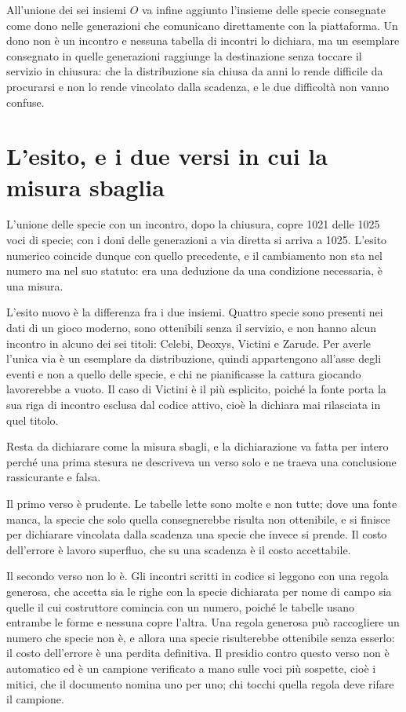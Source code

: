 All'unione dei sei insiemi $O$ va infine aggiunto l'insieme delle specie consegnate come dono nelle generazioni che comunicano direttamente con la piattaforma. Un dono non è un incontro e nessuna tabella di incontri lo dichiara, ma un esemplare consegnato in quelle generazioni raggiunge la destinazione senza toccare il servizio in chiusura: che la distribuzione sia chiusa da anni lo rende difficile da procurarsi e non lo rende vincolato dalla scadenza, e le due difficoltà non vanno confuse.

\section{L'esito, e i due versi in cui la misura sbaglia}

L'unione delle specie con un incontro, dopo la chiusura, copre 1021 delle 1025 voci di specie; con i doni delle generazioni a via diretta si arriva a 1025. L'esito numerico coincide dunque con quello precedente, e il cambiamento non sta nel numero ma nel suo statuto: era una deduzione da una condizione necessaria, è una misura.

L'esito nuovo è la differenza fra i due insiemi. Quattro specie sono presenti nei dati di un gioco moderno, sono ottenibili senza il servizio, e non hanno alcun incontro in alcuno dei sei titoli: Celebi, Deoxys, Victini e Zarude. Per averle l'unica via è un esemplare da distribuzione, quindi appartengono all'asse degli eventi e non a quello delle specie, e chi ne pianificasse la cattura giocando lavorerebbe a vuoto. Il caso di Victini è il più esplicito, poiché la fonte porta la sua riga di incontro esclusa dal codice attivo, cioè la dichiara mai rilasciata in quel titolo.

Resta da dichiarare come la misura sbagli, e la dichiarazione va fatta per intero perché una prima stesura ne descriveva un verso solo e ne traeva una conclusione rassicurante e falsa.

Il primo verso è prudente. Le tabelle lette sono molte e non tutte; dove una fonte manca, la specie che solo quella consegnerebbe risulta non ottenibile, e si finisce per dichiarare vincolata dalla scadenza una specie che invece si prende. Il costo dell'errore è lavoro superfluo, che su una scadenza è il costo accettabile.

Il secondo verso non lo è. Gli incontri scritti in codice si leggono con una regola generosa, che accetta sia le righe con la specie dichiarata per nome di campo sia quelle il cui costruttore comincia con un numero, poiché le tabelle usano entrambe le forme e nessuna copre l'altra. Una regola generosa può raccogliere un numero che specie non è, e allora una specie risulterebbe ottenibile senza esserlo: il costo dell'errore è una perdita definitiva. Il presidio contro questo verso non è automatico ed è un campione verificato a mano sulle voci più sospette, cioè i mitici, che il documento nomina uno per uno; chi tocchi quella regola deve rifare il campione.

